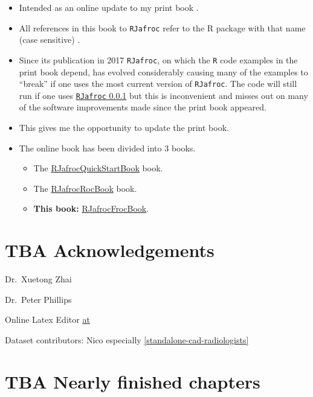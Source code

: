\documentclass[
]{book}
\providecommand{\tightlist}{%
  \setlength{\itemsep}{0pt}\setlength{\parskip}{0pt}}
\begin{document}
\begin{itemize}
\tightlist
\item
  Intended as an online update to my print book \citep{chakraborty2017observer}.
\item
  All references in this book to \texttt{RJafroc} refer to the R package with that name (case sensitive) \citep{R-RJafroc}.
\item
  Since its publication in 2017 \texttt{RJafroc}, on which the \texttt{R} code examples in the print book depend, has evolved considerably causing many of the examples to ``break'' if one uses the most current version of \texttt{RJafroc}. The code will still run if one uses \href{https://cran.r-project.org/src/contrib/Archive/RJafroc/}{\texttt{RJafroc} 0.0.1} but this is inconvenient and misses out on many of the software improvements made since the print book appeared.
\item
  This gives me the opportunity to update the print book.
\item
  The online book has been divided into 3 books.

  \begin{itemize}
  \tightlist
  \item
    The \href{https://dpc10ster.github.io/RJafrocQuickStart/}{RJafrocQuickStartBook} book.
  \item
    The \href{https://dpc10ster.github.io/RJafrocRocBook/}{RJafrocRocBook} book.
  \item
    \textbf{This book:} \href{https://dpc10ster.github.io/RJafrocFrocBook/}{RJafrocFrocBook}.
  \end{itemize}
\end{itemize}

\hypertarget{tba-acknowledgements}{%
\section{TBA Acknowledgements}\label{tba-acknowledgements}}

Dr.~Xuetong Zhai

Dr.~Peter Phillips

Online Latex Editor \href{https://latexeditor.lagrida.com/}{at}

Dataset contributors: Nico especially \ref{standalone-cad-radiologists}

\hypertarget{tba-nearly-finished-chapters}{%
\section{TBA Nearly finished chapters}\label{tba-nearly-finished-chapters}}
\end{document}
